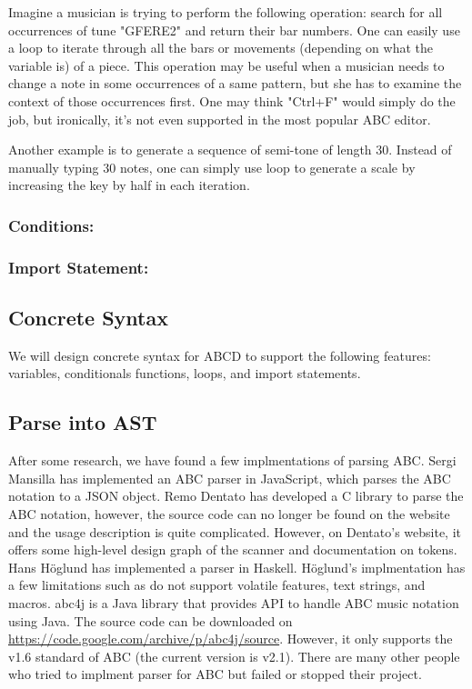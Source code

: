 	Imagine a musician is trying to perform the following operation: search for all occurrences of tune "GFERE2" and return their bar numbers. One can easily use a loop to iterate through all the bars or movements (depending on what the variable is) of a piece. This operation may be useful when a musician needs to change a note in some occurrences of a same pattern, but she has to examine the context of those occurrences first. One may think "Ctrl+F" would simply do the job, but ironically, it's not even supported in the most popular ABC editor\cite{SlashdotMedia17}.  

	Another example is to generate a sequence of semi-tone of length 30. Instead of manually typing 30 notes, one can simply use loop to generate a scale by increasing the key by half in each iteration.

	\subsubsection{Conditions:}
		
	\subsubsection{Import Statement:}
\subsection{Concrete Syntax}
We will design concrete syntax for ABCD to support the following features: variables, conditionals functions, loops, and import statements.
\subsection{Parse into AST}

After some research, we have found a few implmentations of parsing ABC. Sergi Mansilla has implemented an ABC parser in JavaScript, which parses the ABC notation to a JSON object\cite{Mansilla12}. Remo Dentato has developed a C library to parse the ABC notation\cite{Dentato09}, however, the source code can no longer be found on the website and the usage description is quite complicated. However, on Dentato's website, it offers some high-level design graph of the scanner and documentation on tokens. Hans H\"{o}glund has implemented a parser in Haskell\cite{Hoglund15}. H\"{o}glund's implmentation has a few limitations such as do not support volatile features, text strings, and macros. abc4j is a Java library that provides API to handle ABC music notation using Java. The source code can be downloaded on \url{https://code.google.com/archive/p/abc4j/source}. However, it only supports the v1.6 standard of ABC (the current version is v2.1). There are many other people who tried to implment parser for ABC but failed or stopped their project.

